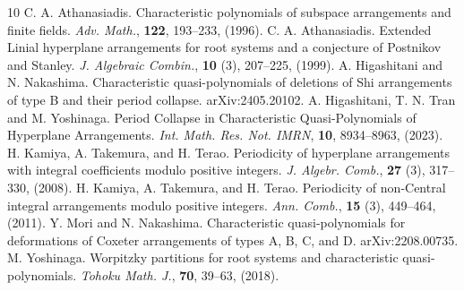 \documentclass{article}
\theoremstyle{plain}
\theoremstyle{definition}
\theoremstyle{remark}
\numberwithin{equation}{section}
\begin{document}
\begin{thebibliography}{10}
 C. A. Athanasiadis. Characteristic polynomials of subspace arrangements and finite fields. \textit{Adv. Math.}, {\bf 122}, 193--233, (1996).
 C. A. Athanasiadis. Extended Linial hyperplane arrangements for root systems and a conjecture of Postnikov and Stanley. \textit{J. Algebraic Combin.}, {\bf 10} (3), 207--225, (1999).
 A. Higashitani and N. Nakashima. Characteristic quasi-polynomials of deletions of Shi arrangements of type B and their period collapse. arXiv:2405.20102.  
 A. Higashitani, T. N. Tran and M. Yoshinaga. Period Collapse in Characteristic Quasi-Polynomials of Hyperplane Arrangements. \textit{Int. Math. Res. Not. IMRN}, {\bf 10}, 8934--8963, (2023).
 H. Kamiya, A. Takemura, and H. Terao. Periodicity of hyperplane arrangements with integral coefficients modulo positive integers. \textit{J. Algebr. Comb.}, {\bf 27} (3), 317--330, (2008).
 H. Kamiya, A. Takemura, and H. Terao. Periodicity of non-Central integral arrangements modulo positive integers. \textit{Ann. Comb.}, {\bf 15} (3), 449--464, (2011).
 Y. Mori and N. Nakashima. Characteristic quasi-polynomials for deformations of Coxeter arrangements of types A, B, C, and D. arXiv:2208.00735. 
 M. Yoshinaga. Worpitzky partitions for root systems and characteristic quasi-polynomials. \textit{Tohoku Math. J.}, {\bf 70}, 39--63, (2018).

\end{thebibliography}
\end{document}
